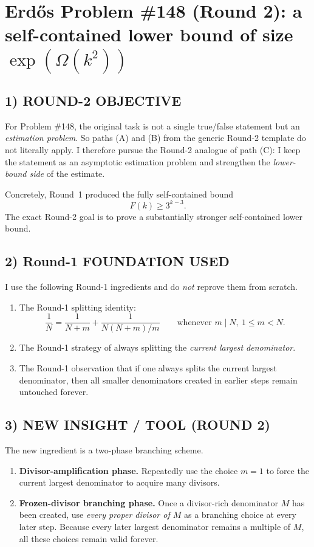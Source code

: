 
\section{Erd\H{o}s Problem \#148 (Round 2): a self-contained lower bound of size $\exp(\Omega(k^2))$}

\subsection*{1) ROUND-2 OBJECTIVE}
For Problem \#148, the original task is not a single true/false statement but an \emph{estimation problem}. So paths (A) and (B) from the generic Round-2 template do not literally apply. I therefore pursue the Round-2 analogue of path (C): I keep the statement as an asymptotic estimation problem and strengthen the \emph{lower-bound side} of the estimate.

Concretely, Round~1 produced the fully self-contained bound
\[
F(k)\ge 3^{k-3}.
\]
The exact Round-2 goal is to prove a substantially stronger self-contained lower bound.

\subsection*{2) Round-1 FOUNDATION USED}
I use the following Round-1 ingredients and do \emph{not} reprove them from scratch.

\begin{enumerate}
\item The Round-1 splitting identity:
\[
\frac1N=\frac1{N+m}+\frac1{N(N+m)/m}
\qquad\mbox{whenever }m\mid N,\ 1\le m<N.
\]
\item The Round-1 strategy of always splitting the \emph{current largest denominator}.
\item The Round-1 observation that if one always splits the current largest denominator, then all smaller denominators created in earlier steps remain untouched forever.
\end{enumerate}

\subsection*{3) NEW INSIGHT / TOOL (ROUND 2)}
The new ingredient is a two-phase branching scheme.

\begin{enumerate}
\item \textbf{Divisor-amplification phase.} Repeatedly use the choice $m=1$ to force the current largest denominator to acquire many divisors.
\item \textbf{Frozen-divisor branching phase.} Once a divisor-rich denominator $M$ has been created, use \emph{every proper divisor of $M$} as a branching choice at every later step. Because every later largest denominator remains a multiple of $M$, all these choices remain valid forever.
\end{enumerate}

